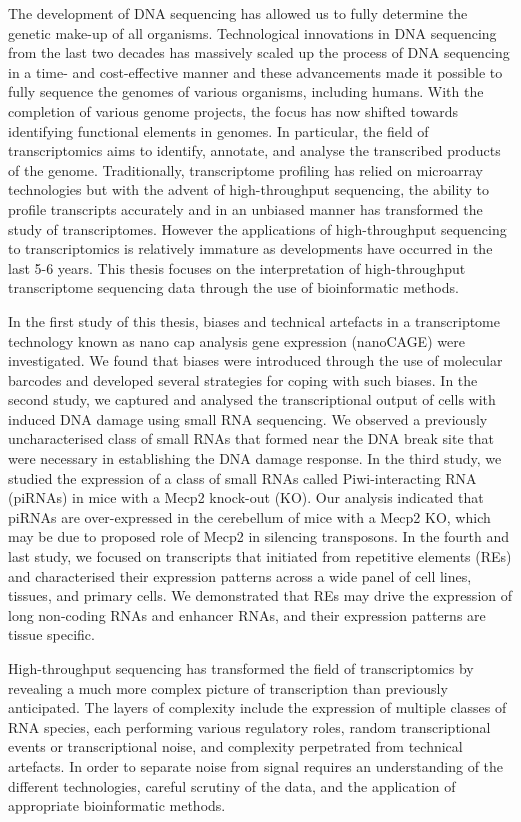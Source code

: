 The development of DNA sequencing has allowed us to fully determine the genetic make-up of all organisms. Technological innovations in DNA sequencing from the last two decades has massively scaled up the process of DNA sequencing in a time- and cost-effective manner and these advancements made it possible to fully sequence the genomes of various organisms, including humans. With the completion of various genome projects, the focus has now shifted towards identifying functional elements in genomes. In particular, the field of transcriptomics aims to identify, annotate, and analyse the transcribed products of the genome. Traditionally, transcriptome profiling has relied on microarray technologies but with the advent of high-throughput sequencing, the ability to profile transcripts accurately and in an unbiased manner has transformed the study of transcriptomes. However the applications of high-throughput sequencing to transcriptomics is relatively immature as developments have occurred in the last 5-6 years. This thesis focuses on the interpretation of high-throughput transcriptome sequencing data through the use of bioinformatic methods.

In the first study of this thesis, biases and technical artefacts in a transcriptome technology known as nano cap analysis gene expression (nanoCAGE) were investigated. We found that biases were introduced through the use of molecular barcodes and developed several strategies for coping with such biases. In the second study, we captured and analysed the transcriptional output of cells with induced DNA damage using small RNA sequencing. We observed a previously uncharacterised class of small RNAs that formed near the DNA break site that were necessary in establishing the DNA damage response. In the third study, we studied the expression of a class of small RNAs called Piwi-interacting RNA (piRNAs) in mice with a Mecp2 knock-out (KO). Our analysis indicated that piRNAs are over-expressed in the cerebellum of mice with a Mecp2 KO, which may be due to proposed role of Mecp2 in silencing transposons. In the fourth and last study, we focused on transcripts that initiated from repetitive elements (REs) and characterised their expression patterns across a wide panel of cell lines, tissues, and primary cells. We demonstrated that REs may drive the expression of long non-coding RNAs and enhancer RNAs, and their expression patterns are tissue specific.

High-throughput sequencing has transformed the field of transcriptomics by revealing a much more complex picture of transcription than previously anticipated. The layers of complexity include the expression of multiple classes of RNA species, each performing various regulatory roles, random transcriptional events or transcriptional noise, and complexity perpetrated from technical artefacts. In order to separate noise from signal requires an understanding of the different technologies, careful scrutiny of the data, and the application of appropriate bioinformatic methods.

